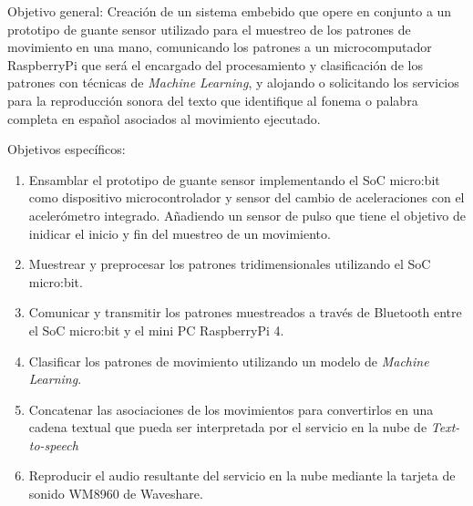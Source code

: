 \hfill\break 
Objetivo general: \hfill\break
Creación de un sistema embebido que opere en conjunto a un prototipo de guante sensor utilizado para el muestreo de los patrones de movimiento en una mano, comunicando los patrones a un microcomputador RaspberryPi que será el encargado del procesamiento y clasificación de los patrones con técnicas de \textit{Machine Learning}, y alojando o solicitando los servicios para la reproducción sonora del texto que identifique al fonema o palabra completa en español asociados al movimiento ejecutado.

\hfill\break
Objetivos específicos:	
\begin{enumerate}
	
	\item \justifying Ensamblar el prototipo de guante sensor implementando el SoC micro:bit como dispositivo microcontrolador y sensor del cambio de aceleraciones con el acelerómetro integrado. Añadiendo un sensor de pulso que tiene el objetivo de inidicar el inicio y fin del muestreo de un movimiento.

	\item \justifying Muestrear y preprocesar los patrones tridimensionales utilizando el SoC micro:bit.
	
	\item \justifying Comunicar y transmitir los patrones muestreados a través de Bluetooth entre el SoC micro:bit y el mini PC RaspberryPi 4.
	
	\item \justifying Clasificar los patrones de movimiento utilizando un modelo de \textit{Machine Learning}.
	
	\item \justifying Concatenar las asociaciones de los movimientos para convertirlos en una cadena textual que pueda ser interpretada por el servicio en la nube de \textit{Text-to-speech}
	
	\item \justifying Reproducir el audio resultante del servicio en la nube mediante la tarjeta de sonido WM8960 de Waveshare.
\end{enumerate}